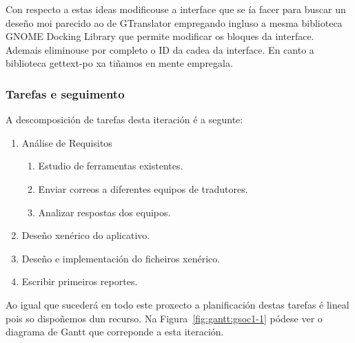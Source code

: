 Con respecto a estas ideas modificouse a interface que se ía facer para buscar un deseño moi parecido ao de GTranslator empregando ingluso a mesma biblioteca GNOME Docking Library que permite modificar os bloques da interface. Ademais eliminouse por completo o ID da cadea da interface. En canto a biblioteca gettext-po xa tiñamos en mente empregala.

\subsubsection{Tarefas e seguimento}

A descomposición de tarefas desta iteración é a segunte:

\begin{enumerate}[label=\bfseries WBS 1.\arabic*]
  \item Análise de Requisitos
    \begin{enumerate}[label=\bfseries WBS 1.1.\arabic*]
      \item Estudio de ferramentas existentes.
      \item Enviar correos a diferentes equipos de tradutores.
      \item Analizar respostas dos equipos.
    \end{enumerate}
  \item Deseño xenérico do aplicativo.
  \item Deseño e implementación do ficheiros xenérico.
  \item Escribir primeiros reportes.
\end{enumerate}

Ao igual que sucederá en todo este proxecto a planificación destas tarefas é lineal pois so dispoñemos dun recurso. Na Figura~\ref{fig:gantt:gsoc1-1} pódese ver o diagrama de Gantt que correponde a esta iteración.

